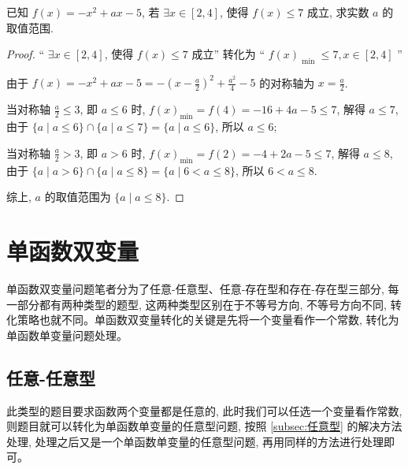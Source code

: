 \begin{variation}\label{variation:2.1.2.3}
  已知 \(f(x)  = -{x}^{2} + {ax}-5\), 若 \(\exists x \in  \left\lbrack  {2, 4}\right\rbrack\), 使得 \(f(x)  \leq  7\) 成立, 求实数 \(a\) 的取值范围.
\end{variation}
\begin{proof}
  “ \(\exists x \in  \left\lbrack  {2, 4}\right\rbrack\), 使得 \(f(x)  \leq  7\) 成立” 转化为 “ \(f{(x) }_{\text{ min }} \leq  7, x \in  \left\lbrack  {2, 4}\right\rbrack\) ”

由于 \(f(x)  = -{x}^{2} + {ax}-5 = -{\left( x-\frac{a}{2}\right) }^{2} + \frac{{a}^{2}}{4}-5\) 的对称轴为 \(x = \frac{a}{2}\).

当对称轴 \(\frac{a}{2} \leq  3\), 即 \(a \leq  6\) 时, \(f{(x) }_{\min } = f\left( 4\right)  = -{16} + {4a}-5 \leq  7\), 解得 \(a \leq  7\), 由于 \(\{ a \mid  a \leq  6\}  \cap  \{ a \mid  a \leq  7\}  = \{ a \mid  a \leq  6\}\), 所以 \(a \leq  6\);

当对称轴 \(\frac{a}{2} > 3\), 即 \(a > 6\) 时, \(f{(x) }_{\min } = f\left( 2\right)  = -4 + {2a}-5 \leq  7\), 解得 \(a \leq  8\), 由于 \(\{ a \mid  a > 6\}  \cap  \{ a \mid  a \leq  8\}  = \{ a \mid  6 < a \leq  8\}\), 所以 \(6 < a \leq  8\).

综上, \(a\) 的取值范围为 \(\{ a \mid  a \leq  8\}\).
\end{proof}



\section{单函数双变量}

单函数双变量问题笔者分为了任意-任意型、任意-存在型和存在-存在型三部分, 每一部分都有两种类型的题型, 这两种类型区别在于不等号方向, 不等号方向不同, 转化策略也就不同。单函数双变量转化的关键是先将一个变量看作一个常数, 转化为单函数单变量问题处理。


\subsection{任意-任意型}\label{subsec:任意-任意型}
此类型的题目要求函数两个变量都是任意的, 此时我们可以任选一个变量看作常数, 则题目就可以转化为单函数单变量的任意型问题, 按照 \ref{subsec:任意型} 的解决方法处理, 处理之后又是一个单函数单变量的任意型问题, 再用同样的方法进行处理即可。


